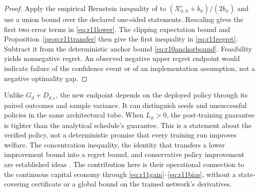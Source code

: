 \begin{proof}
Apply the empirical Bernstein inequality of \citet[Theorem~4]{maurer2009} to $(X^c_{\phi,h}+b_\phi)/(2b_\phi)$ and use a union bound over the declared one-sided statements. Rescaling gives the first two error terms in \eqref{eq:r11lower}. The clipping expectation bound and Proposition~\ref{prop:r11transfer} then give the first inequality in \eqref{eq:r11regret}. Subtract it from the deterministic anchor bound \eqref{eq:r10anchorbound}. Feasibility yields nonnegative regret. An observed negative upper regret endpoint would indicate failure of the confidence event or of an implementation assumption, not a negative optimality gap.
\end{proof}

Unlike $G_d+D_{d,\epsilon}$, the new endpoint depends on the deployed policy through its paired outcomes and sample variance. It can distinguish seeds and unsuccessful policies in the same architectural tube. When $L_\phi>0$, the post-training guarantee is tighter than the analytical schedule's guarantee. This is a statement about the verified policy, not a deterministic promise that every training run improves welfare. The concentration inequality, the identity that transfers a lower improvement bound into a regret bound, and conservative policy improvement are established ideas \citep{kakade2002,pirotta2013,scherrer2015}. The contribution here is their operational connection to the continuous capital economy through \eqref{eq:r11gain}--\eqref{eq:r11bias}, without a state-covering certificate or a global bound on the trained network's derivatives.
